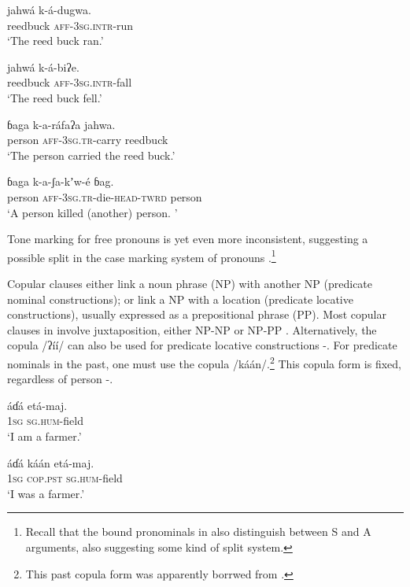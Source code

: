 \documentclass[output=paper]{langsci/langscibook}
\begin{document}
\ea\label{ex:ahlandc:69}
\gll
jahwá        k-á-dugwa. \\
reedbuck  \textsc{aff-3sg.intr}{}-run\\
\glt
‘The reed buck ran.’
\z

\ea\label{ex:ahlandc:70}
\gll
jahwá    k-á-biʔe.\\
reedbuck    \textsc{aff-3sg.intr}{}-fall\\
\glt
‘The reed buck fell.’
\z

\ea\label{ex:ahlandc:71}
\gll
ɓaga     k-a-ráfaʔa     jahwa.\\
person   \textsc{aff-3sg.tr}{}-carry  reedbuck \\
\glt
‘The person carried the reed buck.’
\z

\ea\label{ex:ahlandc:72}
\gll
ɓaga     k-a-ʃa-kʼw-é  ɓag. \\
person \textsc{aff-3sg.tr}{}-die-\textsc{head-twrd}   person\\
\glt
‘A person killed (another) person. ’
\z

Tone marking for free pronouns is yet even more inconsistent, suggesting a possible split in the case marking system of pronouns \citep{Kelly2014}.\footnote{Recall that the bound pronominals in  also distinguish between S and A arguments, also suggesting some kind of split system.} 

Copular clauses either link a noun phrase (NP) with another NP (predicate nominal constructions); or link a NP with a location (predicate locative constructions), usually expressed as a prepositional phrase (PP). Most copular clauses in  involve juxtaposition, either NP-NP  or NP-PP . Alternatively, the copula /ʔíí/ can also be used for predicate locative constructions -. For predicate nominals in the past, one must use the copula /káán/.\footnote{This past copula form was apparently borrwed from .} This copula form is fixed, regardless of person -.

\ea\label{ex:ahlandc:73}
\gll
áɗá    etá-maj. \\
\textsc{1sg}    \textsc{sg.hum}{}-field\\
\glt
‘I am a farmer.’
\z

\ea\label{ex:ahlandc:74}
\gll
áɗá  káán  etá-maj. \\
\textsc{1sg}    \textsc{cop.pst} \textsc{sg.hum}{}-field \\
\glt
‘I was a farmer.’
\z
\end{document}

